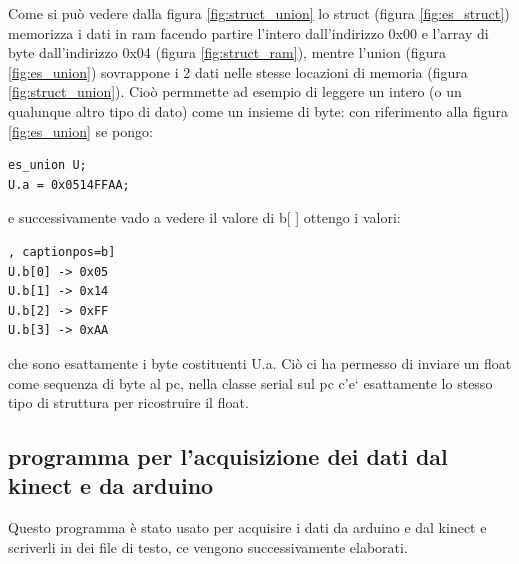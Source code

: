 \documentclass[10pt,a4paper]{article}
\begin{document}
Come si pu\`o vedere dalla figura \ref{fig:struct_union} lo struct (figura \ref{fig:es_struct}) memorizza i dati in ram facendo partire l'intero dall'indirizzo 0x00 e l'array di byte dall'indirizzo 0x04 (figura \ref{fig:struct_ram}), mentre l'union (figura \ref{fig:es_union}) sovrappone i 2 dati nelle stesse locazioni di memoria (figura \ref{fig:struct_union}).
Cio\`o permmette ad esempio di leggere un intero (o un qualunque altro tipo di dato) come un insieme di byte: con riferimento alla figura \ref{fig:es_union} se pongo:
\begin{lstlisting}[style=myArduino, caption=classe "serial", captionpos=b]
es_union U;
U.a = 0x0514FFAA;
\end{lstlisting}
e successivamente vado a vedere il valore di b[ ] ottengo i valori:
\begin{lstlisting}[style=myoutput, caption=print dei valori di b[ ], captionpos=b]
U.b[0] -> 0x05
U.b[1] -> 0x14
U.b[2] -> 0xFF
U.b[3] -> 0xAA
\end{lstlisting}
che sono esattamente i byte costituenti U.a. Ci\`o ci ha permesso di inviare un float come sequenza di byte al pc, nella classe serial sul pc c'e` esattamente lo stesso tipo di struttura per ricostruire il float. 


\subsection{programma per l'acquisizione dei dati dal kinect e da arduino}
Questo programma \`e stato usato per acquisire i dati da arduino e dal kinect e scriverli in dei file di testo, ce vengono successivamente elaborati. 
%
%
\end{document}
